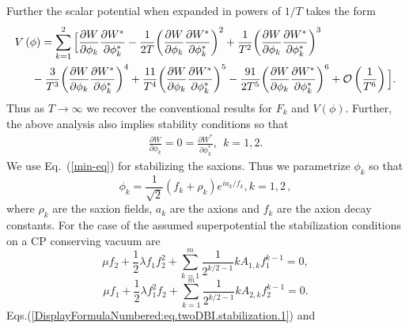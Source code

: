 \documentclass[a4paper,11pt]{article}
\begin{document}
  Further the scalar potential when expanded in powers of $1/T$ takes the form
  \begin{equation}
  \begin{split}
    & V\left(\phi \right)=\sum_{k=1}^2\Big[\frac{\partial W}{\partial \phi_k}\frac{\partial W^*}{\partial \phi^*_k}-\frac{1}{2T}{\left(\frac{\partial W}{\partial \phi_k}\frac{\partial W^*}{\partial \phi^*_k}\right)}^2+\frac{1}{T^2}{\left(\frac{\partial W}{\partial \phi_k}\frac{\partial W^*}{\partial \phi^*_k}\right)}^3 \\
    & \indent{}-\frac{3}{T^3}{\left(\frac{\partial W}{\partial \phi_k}\frac{\partial W^*}{\partial \phi^*_k}\right)}^4+\frac{11}{T^4}{\left(\frac{\partial W}{\partial \phi_k}\frac{\partial W^*}{\partial \phi^*_k}\right)}^5-\frac{91}{2T^5}{\left(\frac{\partial W}{\partial \phi_k}\frac{\partial W^*}{\partial \phi^*_k}\right)}^6+\mathcal{O}\left(\frac{1}{T^6}\right)\Big].
  \end{split}
  \label{vexpand}
  \end{equation}
  Thus as $T \rightarrow \infty$ we recover the conventional results for $F_k$ and $V\left(\phi\right)$. Further, the above analysis also implies stability conditions so that
  \begin{align}
    \frac{\partial W}{\partial \phi_k} = 0= \frac{\partial W^*}{\partial \phi^*_k}, ~~k=1,2.
    \label{min-eq}
  \end{align}
  We use Eq.~(\ref{min-eq}) for stabilizing the saxions. Thus we parametrize $\phi_k$ so that
  \begin{equation} \label{DisplayFormulaNumbered:eq.twoDBI.phi}
    \phi_k = \frac{1}{\sqrt 2} \left(f_k+\rho_k\right) e^{i a_k/f_k}, k=1,2\,,
  \end{equation}
  where $\rho_k$ are the saxion fields, $a_k$ are the axions and $f_k$ are the axion decay constants.
  For the case of the assumed superpotential the
  stabilization conditions on a CP conserving vacuum are
  \begin{equation} \label{DisplayFormulaNumbered:eq.twoDBI.stabilization.1}
    \mu f_2 + \frac{1}{2} \lambda f_1 f_2^2+\sum_{k=1}^m \frac{1}{2^{k/2-1}} k A_{1, k}f_1^{k-1}=0,
  \end{equation}
  \begin{equation} \label{DisplayFormulaNumbered:eq.twoDBI.stabilization.2}
    \mu f_1 + \frac{1}{2} \lambda f_1^2 f_2+\sum_{k=1}^m \frac{1}{2^{k/2-1}} k A_{2, k}f_2^{k-1}=0.
  \end{equation}
  Eqs.(\ref{DisplayFormulaNumbered:eq.twoDBI.stabilization.1}) and
\end{document}
